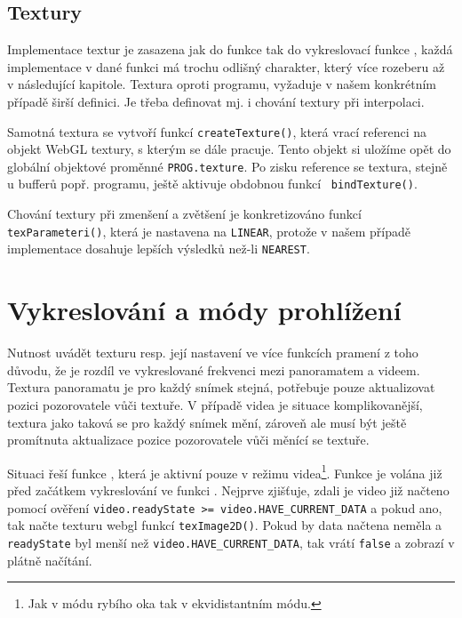 \subsection{Textury}
Implementace textur je zasazena jak do funkce \texttt{\setupProgram} tak do vykreslovací funkce \texttt{\render}, každá implementace v dané funkci má trochu odlišný charakter, který více rozeberu až v následující kapitole. Textura oproti programu, vyžaduje v našem konkrétním případě širší definici. Je třeba definovat mj. i chování textury při interpolaci.

Samotná textura se vytvoří funkcí \texttt{createTexture()}, která vrací referenci na objekt WebGL textury, s kterým se dále pracuje. Tento objekt si uložíme opět do globální objektové proměnné \texttt{PROG.texture}. Po zisku  reference se textura, stejně u bufferů popř. programu, ještě aktivuje obdobnou funkcí \texttt{ bindTexture()}.

Chování textury při zmenšení a zvětšení je konkretizováno funkcí \texttt{texParameteri()}, která je nastavena na \texttt{LINEAR}, protože v našem případě implementace dosahuje lepších výsledků než-li \texttt{NEAREST}.


\newpage

\section{Vykreslování a módy prohlížení}
Nutnost uvádět texturu resp. její nastavení ve více funkcích pramení z toho důvodu, že je rozdíl ve vykreslované frekvenci mezi panoramatem a videem. Textura panoramatu je pro každý snímek stejná, potřebuje pouze aktualizovat pozici pozorovatele vůči textuře. V případě videa je situace komplikovanější, textura jako taková se pro každý snímek mění, zároveň ale musí být ještě promítnuta aktualizace pozice pozorovatele vůči měnící se textuře. 

Situaci řeší funkce \texttt{\updateTexture}, která je aktivní pouze v režimu videa\footnote{Jak v módu rybího oka tak v ekvidistantním módu.}. Funkce je volána již před začátkem vykreslování ve funkci \texttt{\render}. Nejprve zjišťuje, zdali je video již načteno pomocí ověření \texttt{video.readyState >= video.HAVE\_CURRENT\_DATA} a pokud ano, tak načte texturu webgl funkcí \texttt{texImage2D()}. Pokud by data načtena neměla a \texttt{readyState} byl menší než \texttt{video.HAVE\_CURRENT\_DATA}, tak vrátí \texttt{false} a zobrazí  v plátně načítání.


